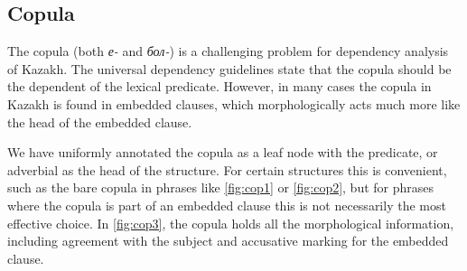\documentclass[a4paper,11pt, onecolumn,twoside]{article}
\begin{document}

\subsection{Copula}

The copula (both \emph{е-} and \emph{бол-}) is a challenging problem for dependency 
analysis of Kazakh. The universal dependency guidelines state that the copula should
be the dependent of the lexical predicate. However, in many cases the copula in Kazakh
is found in embedded clauses, which morphologically acts much more like the head of the embedded clause.

We have uniformly annotated the copula as a leaf node with the predicate, or adverbial
as the head of the structure. For certain structures this is convenient, such as the
bare copula in phrases like \ref{fig:cop1} or \ref{fig:cop2}, but for phrases where
the copula is part of an embedded clause this is not necessarily the most  
effective choice. In \ref{fig:cop3}, the copula holds all the morphological information, including
agreement with the subject and accusative marking for the embedded clause.
\end{document}
